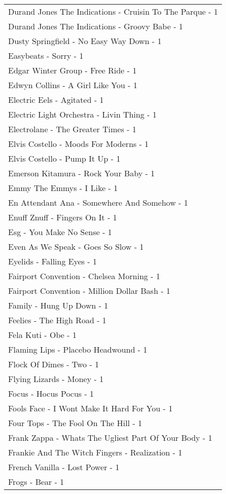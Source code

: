 \documentclass[
]{article}
\begin{document}
\begin{longtable}{l}
Durand Jones The Indications - Cruisin To The Parque - 1 \\ 
Durand Jones The Indications - Groovy Babe - 1 \\ 
Dusty Springfield - No Easy Way Down - 1 \\ 
Easybeats - Sorry - 1 \\ 
Edgar Winter Group - Free Ride - 1 \\ 
Edwyn Collins - A Girl Like You - 1 \\ 
Electric Eels - Agitated - 1 \\ 
Electric Light Orchestra - Livin Thing - 1 \\ 
Electrolane - The Greater Times - 1 \\ 
Elvis Costello - Moods For Moderns - 1 \\ 
Elvis Costello - Pump It Up - 1 \\ 
Emerson Kitamura - Rock Your Baby - 1 \\ 
Emmy The Emmys - I Like - 1 \\ 
En Attendant Ana - Somewhere And Somehow - 1 \\ 
Enuff Znuff - Fingers On It - 1 \\ 
Esg - You Make No Sense - 1 \\ 
Even As We Speak - Goes So Slow - 1 \\ 
Eyelids - Falling Eyes - 1 \\ 
Fairport Convention - Chelsea Morning - 1 \\ 
Fairport Convention - Million Dollar Bash - 1 \\ 
Family - Hung Up Down - 1 \\ 
Feelies - The High Road - 1 \\ 
Fela Kuti - Obe - 1 \\ 
Flaming Lips - Placebo Headwound - 1 \\ 
Flock Of Dimes - Two - 1 \\ 
Flying Lizards - Money - 1 \\ 
Focus - Hocus Pocus - 1 \\ 
Fools Face - I Wont Make It Hard For You - 1 \\ 
Four Tops - The Fool On The Hill - 1 \\ 
Frank Zappa - Whats The Ugliest Part Of Your Body - 1 \\ 
Frankie And The Witch Fingers - Realization - 1 \\ 
French Vanilla - Lost Power - 1 \\ 
Frogs - Bear - 1 \\ 

\end{longtable}
\end{document}
